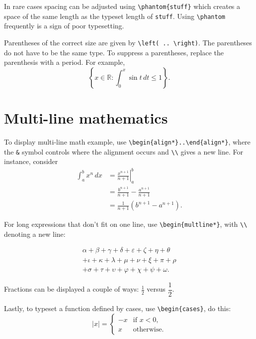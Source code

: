 \documentclass{article}
\begin{document}
In rare cases spacing can be adjusted using \verb~\phantom{stuff}~ which
creates a space of the same length as the typeset length of \verb~stuff~.
Using \verb~\phantom~ frequently is a sign of poor typesetting.

Parentheses of the correct size are given by \verb~\left( .. \right)~.  The
parentheses do not have to be the same type.  To suppress a parentheses,
replace the parenthesis with a period.  For example,
\[ \left\{ x \in \mathbb{R} : \int_0^x \sin t \, dt \leq 1
  \right \}. \]

\section{Multi-line mathematics}

To display multi-line math example, use \verb~\begin{align*}..\end{align*}~,
where the \verb~&~ symbol controls where the alignment occurs and \verb~\\~
gives a new line.  For instance, consider
\begin{align}
  \int_a^b x^n \, dx
 & = \left. \frac{x^{n+1}}{n+1} \right|_a^b   \\
 & = \frac{b^{n+1}}{n+1} -\frac{a^{n+1}}{n+1} \nonumber \\
 & = \frac{1}{n+1}(b^{n+1}-a^{n+1}).
\end{align}

For long expressions that don't fit on one line, use
\verb~\begin{multline*}~, with \verb~\\~ denoting a new line:

\begin{multline*}
  \alpha + \beta + \gamma + \delta + \varepsilon + \zeta + \eta + \theta   \\
  + \iota + \kappa + \lambda + \mu + \nu + \xi + \pi + \rho \\
  + \sigma + \tau + \upsilon + \varphi + \chi + \psi + \omega.
\end{multline*}

Fractions can be displayed a couple of ways: \(\frac{1}{2}\) versus \(\dfrac{1}{2}\).

Lastly, to typeset a function defined by cases, use \verb~\begin{cases}~, do this:
\[
  |x| =
  \begin{cases}
    -x & \text{if \(x < 0\)}, \\
    x  & \text{otherwise}.
  \end{cases}
\]
\end{document}
